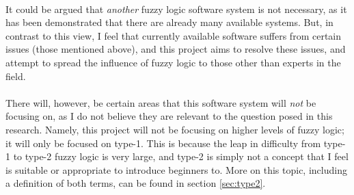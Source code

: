 \ \\
It could be argued that \textit{another} fuzzy logic software system is not necessary, as it has been demonstrated that there are already many available systems. But, in contrast to this view, I feel that currently available software suffers from certain issues (those mentioned above), and this project aims to resolve these issues, and attempt to spread the influence of fuzzy logic to those other than experts in the field.\ \\
\ \\
There will, however, be certain areas that this software system will \textit{not} be focusing on, as I do not believe they are relevant to the question posed in this research. Namely, this project will not be focusing on higher levels of fuzzy logic; it will only be focused on type-1. This is because the leap in difficulty from type-1 to type-2 fuzzy logic is very large, and type-2 is simply not a concept that I feel is suitable or appropriate to introduce beginners to. More on this topic, including a definition of both terms, can be found in section \ref{sec:type2}.